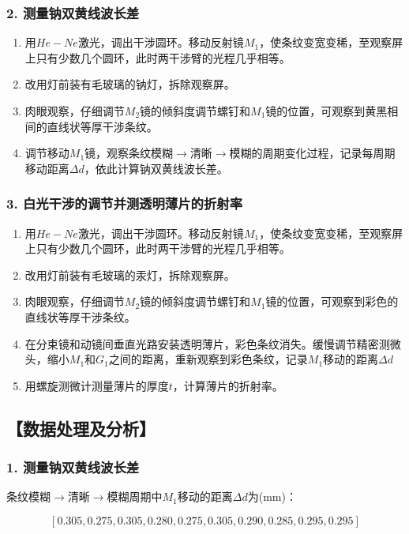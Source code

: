 \documentclass[12pt,a4paper,UTF8]{ctexart}
\begin{document}
	\subsubsection*{2. 测量钠双黄线波长差}
		\begin{enumerate}[label=\arabic*.]
			\item 用$ He-Ne $激光，调出干涉圆环。移动反射镜$M_1$，使条纹变宽变稀，至观察屏上只有少数几个圆环，此时两干涉臂的光程几乎相等。
			\item 改用灯前装有毛玻璃的钠灯，拆除观察屏。
			\item 肉眼观察，仔细调节$M_2$镜的倾斜度调节螺钉和$M_1$镜的位置，可观察到黄黑相间的直线状等厚干涉条纹。
			\item 调节移动$M_1$镜，观察条纹模糊$\to$清晰$\to$模糊的周期变化过程，记录每周期移动距离$\Delta d$，依此计算钠双黄线波长差。
		\end{enumerate}

	\subsubsection*{3. 白光干涉的调节并测透明薄片的折射率}
		\begin{enumerate}[label=\arabic*.]
			\item 用$ He-Ne $激光，调出干涉圆环。移动反射镜$M_1$，使条纹变宽变稀，至观察屏上只有少数几个圆环，此时两干涉臂的光程几乎相等。
			\item 改用灯前装有毛玻璃的汞灯，拆除观察屏。
			\item 肉眼观察，仔细调节$M_2$镜的倾斜度调节螺钉和$M_1$镜的位置，可观察到彩色的直线状等厚干涉条纹。
			\item 在分束镜和动镜间垂直光路安装透明薄片，彩色条纹消失。缓慢调节精密测微头，缩小$M_1$和$G_1$之间的距离，重新观察到彩色条纹，记录$M_1$移动的距离$\Delta d$
			\item 用螺旋测微计测量薄片的厚度$t$，计算薄片的折射率。
		\end{enumerate}


\subsection*{【数据处理及分析】}
	\subsubsection*{1. 测量钠双黄线波长差}
		条纹模糊$\to$清晰$\to$模糊周期中$M_1$移动的距离$\Delta d$为(mm)：
		
		$$
		[0.305,0.275,0.305,0.280,0.275,0.305,0.290,0.285,0.295,0.295]
		$$
\end{document}

